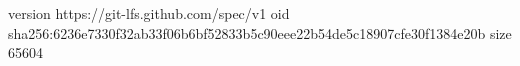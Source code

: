 version https://git-lfs.github.com/spec/v1
oid sha256:6236e7330f32ab33f06b6bf52833b5c90eee22b54de5c18907cfe30f1384e20b
size 65604
